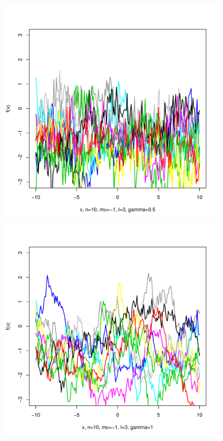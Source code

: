 \documentclass[12pt,letterpaper]{article}
\begin{document}
\begin{figure}
\begin{center}
\includegraphics[scale=0.2]{hw321/n10-m-1-l3-g1.pdf}
\includegraphics[scale=0.2]{hw321/n10-m-1-l3-g2.pdf}

\end{center}
\end{figure}
\end{document}
